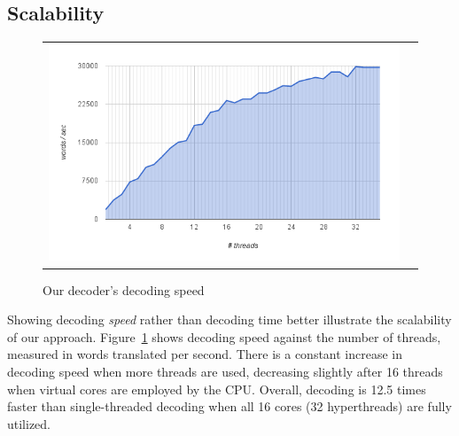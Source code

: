 \documentclass[11pt]{article}
\begin{document}
\subsection{Scalability}

\begin{figure}[h]
\centering
\begin{tabular}{cc}
{\includegraphics[scale=0.4]{scalability.png}} 
\end{tabular}
\caption{Our decoder's decoding speed}
\label{fig:speed}
\end{figure} 

Showing decoding \emph{speed} rather than decoding time better illustrate the scalability of our approach. Figure~\ref{fig:speed} shows decoding speed against the number of threads, measured in words translated per second. There is a constant increase in decoding speed when more threads are used, decreasing slightly after 16 threads when virtual cores are employed by the CPU. Overall, decoding is 12.5 times faster than single-threaded decoding when all 16 cores (32 hyperthreads) are fully utilized.

\end{document}
